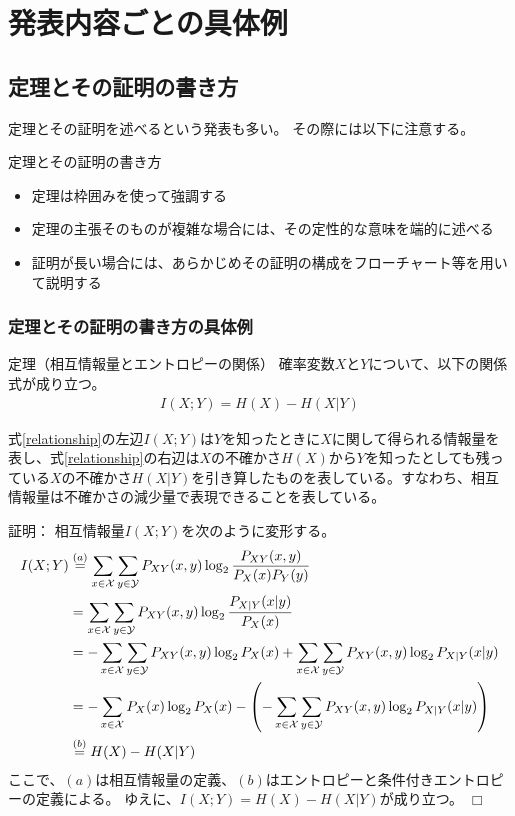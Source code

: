 \documentclass[a4j]{jsarticle}
\def \QED{\hfill $\Box$}%
\begin{document}
\section{発表内容ごとの具体例}

\subsection{定理とその証明の書き方}
定理とその証明を述べるという発表も多い。
その際には以下に注意する。
\begin{itembox}[l]{定理とその証明の書き方}
\begin{itemize}
\item 定理は枠囲みを使って強調する
\item 定理の主張そのものが複雑な場合には、その定性的な意味を端的に述べる
\item 証明が長い場合には、あらかじめその証明の構成をフローチャート等を用いて説明する
\end{itemize}
\end{itembox}

\subsubsection{定理とその証明の書き方の具体例}

\begin{itembox}[l]{定理（相互情報量とエントロピーの関係）}
確率変数$X$と$Y$について、以下の関係式が成り立つ。
\begin{align}
I(X; Y) = H(X) - H(X|Y) \label{relationship}
\end{align}
\end{itembox}

式\eqref{relationship}の左辺$I(X; Y)$は$Y$を知ったときに$X$に関して得られる情報量を表し、式\eqref{relationship}の右辺は$X$の不確かさ$H(X)$から$Y$を知ったとしても残っている$X$の不確かさ$H(X|Y)$を引き算したものを表している。すなわち、相互情報量は不確かさの減少量で表現できることを表している。

\medskip

証明：
相互情報量$I(X; Y)$を次のように変形する。
\begin{align}
I(X; Y) 
&\overset{(a)}{=} \sum_{x \in {\cal X}} \sum_{y \in {\cal Y}} P_{XY} (x,y) \log_2 \frac{P_{XY} (x,y)}{P_{X}(x)P_{Y}(y)} \\
&= \sum_{x \in {\cal X}} \sum_{y \in {\cal Y}} P_{XY} (x,y) \log_2 \frac{P_{X|Y} (x|y)}{P_{X}(x)} \\
&= - \sum_{x \in {\cal X}} \sum_{y \in {\cal Y}} P_{XY} (x,y) \log_2 P_{X} (x) + \sum_{x \in {\cal X}} \sum_{y \in {\cal Y}} P_{XY} (x,y) \log_2 P_{X|Y} (x|y) \\
&= - \sum_{x \in {\cal X}} P_{X} (x) \log_2 P_{X} (x) - \left( -\sum_{x \in {\cal X}} \sum_{y \in {\cal Y}} P_{XY} (x,y) \log_2 P_{X|Y} (x|y) \right) \\
&\overset{(b)}{=} H(X) - H(X | Y)
\end{align}
ここで、$(a)$は相互情報量の定義、$(b)$はエントロピーと条件付きエントロピーの定義による。
ゆえに、$I(X; Y) = H(X) - H(X|Y)$が成り立つ。
\QED
\end{document}
